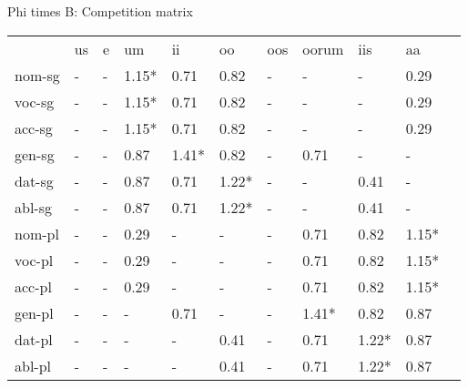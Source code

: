 \documentclass{article}
\begin{document}
Phi times B: Competition matrix 

\begin{tabular}{lllllllllll}\toprule
                  &us      &e       &um      &ii      &oo      &oos     &oorum   &iis     &aa      \\ 
nom-sg         &    -   &    -   & 1.15*  &  0.71  &  0.82  &    -   &    -   &    -   &  0.29  \\ 
voc-sg         &    -   &    -   & 1.15*  &  0.71  &  0.82  &    -   &    -   &    -   &  0.29  \\ 
acc-sg         &    -   &    -   & 1.15*  &  0.71  &  0.82  &    -   &    -   &    -   &  0.29  \\ 
gen-sg         &    -   &    -   &  0.87  & 1.41*  &  0.82  &    -   &  0.71  &    -   &    -   \\ 
dat-sg         &    -   &    -   &  0.87  &  0.71  & 1.22*  &    -   &    -   &  0.41  &    -   \\ 
abl-sg         &    -   &    -   &  0.87  &  0.71  & 1.22*  &    -   &    -   &  0.41  &    -   \\ 
nom-pl         &    -   &    -   &  0.29  &    -   &    -   &    -   &  0.71  &  0.82  & 1.15*  \\ 
voc-pl         &    -   &    -   &  0.29  &    -   &    -   &    -   &  0.71  &  0.82  & 1.15*  \\ 
acc-pl         &    -   &    -   &  0.29  &    -   &    -   &    -   &  0.71  &  0.82  & 1.15*  \\ 
gen-pl         &    -   &    -   &    -   &  0.71  &    -   &    -   & 1.41*  &  0.82  &  0.87  \\ 
dat-pl         &    -   &    -   &    -   &    -   &  0.41  &    -   &  0.71  & 1.22*  &  0.87  \\ 
abl-pl         &    -   &    -   &    -   &    -   &  0.41  &    -   &  0.71  & 1.22*  &  0.87  \\ 
\end{tabular}

 \vspace{0.2in}
\end{document}
